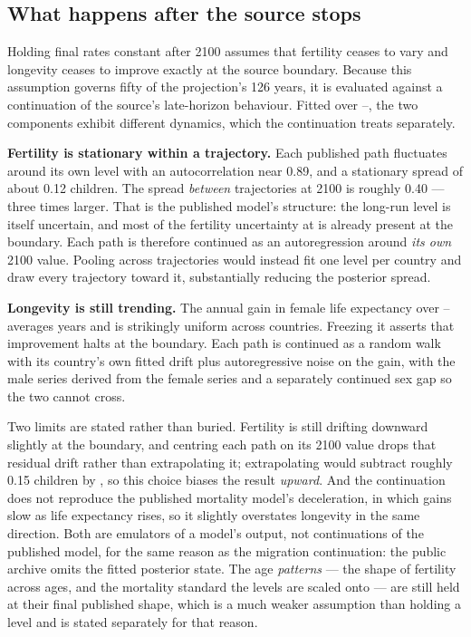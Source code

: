 \subsection{What happens after the source stops}
\label{sec:post-2100}

Holding final rates constant after 2100 assumes that fertility ceases to vary and
longevity ceases to improve exactly at the source boundary. Because this
assumption governs fifty of the projection's 126 years, it is evaluated against
a continuation of the source's late-horizon behaviour. Fitted over
\ExtensionFitStart{}--\ExtensionFitEnd{}, the two components exhibit different
dynamics, which the continuation treats separately.

\textbf{Fertility is stationary within a trajectory.} Each published path
fluctuates around its own level with an autocorrelation near 0.89, and a
stationary spread of about 0.12 children. The spread \emph{between} trajectories
at 2100 is roughly 0.40 --- three times larger. That is the published model's
structure: the long-run level is itself uncertain, and most of the fertility
uncertainty at \ProjectionEndYear{} is already present at the boundary. Each path
is therefore continued as an autoregression around \emph{its own} 2100 value.
Pooling across trajectories would instead fit one level per country and draw
every trajectory toward it, substantially reducing the posterior spread.

\textbf{Longevity is still trending.} The annual gain in female life expectancy
over \ExtensionFitStart{}--\ExtensionFitEnd{} averages
\ContinuationEZeroDrift{} years and is strikingly uniform across countries.
Freezing it asserts that improvement halts at the boundary. Each path is
continued as a random walk with its country's own fitted drift plus
autoregressive noise on the gain, with the male series derived from the female
series and a separately continued sex gap so the two cannot cross.

Two limits are stated rather than buried. Fertility is still drifting downward
slightly at the boundary, and centring each path on its 2100 value drops that
residual drift rather than extrapolating it; extrapolating would subtract roughly
0.15 children by \ProjectionEndYear{}, so this choice biases the result
\emph{upward}. And the continuation does not reproduce the published mortality
model's deceleration, in which gains slow as life expectancy rises, so it
slightly overstates longevity in the same direction. Both are emulators of a model's
output, not continuations of the published model, for the same reason as the
migration continuation: the public archive omits the fitted posterior state. The
age \emph{patterns} --- the shape of fertility across ages, and the mortality
standard the levels are scaled onto --- are still held at their final published
shape, which is a much weaker assumption than holding a level and is stated
separately for that reason.

